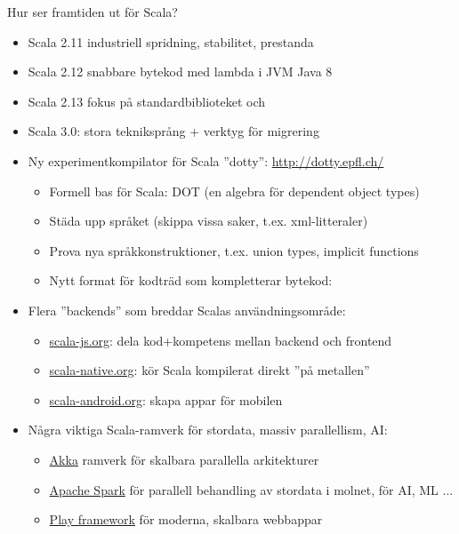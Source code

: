 \begin{Slide}{Hur ser framtiden ut för Scala?}\SlideFontSmall

\begin{itemize}
\item Scala 2.11 industriell spridning, stabilitet, prestanda
\item Scala 2.12 snabbare bytekod med lambda i JVM Java 8
\item Scala 2.13 fokus på standardbiblioteket och 
\item Scala 3.0: stora tekniksprång + verktyg för migrering
\item Ny experimentkompilator för Scala ''dotty'': \url{http://dotty.epfl.ch/}
\begin{itemize}\SlideFontTiny
  \item Formell bas för Scala: DOT (en algebra för dependent object types)
  \item Städa upp språket (skippa vissa saker, t.ex. xml-litteraler)
  \item Prova nya språkkonstruktioner, t.ex. union types, implicit functions
  \item Nytt format för kodträd som kompletterar bytekod: \\
\end{itemize}
\item Flera ''backends'' som breddar Scalas användningsområde:
\begin{itemize}\SlideFontTiny
  \item \href{http://www.scala-js.org/}{scala-js.org}: dela kod+kompetens mellan backend och frontend
  \item \href{http://scala-native.org}{scala-native.org}: kör Scala kompilerat direkt ''på metallen''
  \item \href{http://scala-android.org}{scala-android.org}: skapa appar för mobilen
\end{itemize}
\item Några viktiga Scala-ramverk för stordata, massiv parallellism, AI:
\begin{itemize}\SlideFontTiny
  \item \href{https://akka.io/}{Akka} ramverk för skalbara parallella arkitekturer
  \item \href{https://spark.apache.org/}{Apache Spark} för parallell behandling av stordata i molnet, för AI, ML ...
  \item \href{https://www.playframework.com/}{Play framework} för moderna, skalbara webbappar
\end{itemize}
\end{itemize}
\end{Slide}



